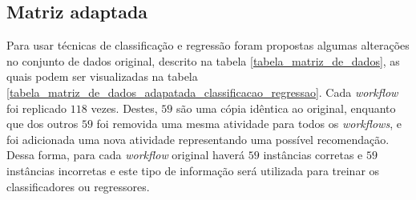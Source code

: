 \documentclass[10pt]{article}
\begin{document}
\subsection*{Matriz adaptada}
Para usar técnicas de classificação e regressão foram propostas algumas alterações no conjunto de dados original, descrito na tabela \ref{tabela_matriz_de_dados}, as quais podem ser visualizadas na tabela \ref{tabela_matriz_de_dados_adapatada_classificacao_regressao}. Cada \emph{workflow} foi replicado \(118\) vezes. Destes, \(59\) são uma cópia idêntica ao original, enquanto que dos outros \(59\) foi removida uma mesma atividade para todos os \emph{workflows}, e foi adicionada uma nova atividade representando uma possível recomendação. Dessa forma, para cada \emph{workflow} original haverá \(59\) instâncias corretas e \(59\) instâncias incorretas e este tipo de informação será utilizada para treinar os classificadores ou regressores.
\end{document}
